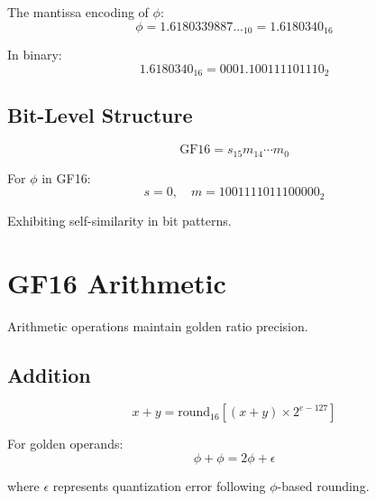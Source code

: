 \begin{theorem}
\label{thm:golden-mantissa}
The mantissa encoding of $\phi$:
\begin{equation}
\phi = 1.6180339887..._10 = 1.6180340_16
\end{equation}

In binary:
\begin{equation}
1.6180340_16 = 0001.100111101110_2
\end{equation}
\end{theorem}

\subsection{Bit-Level Structure}

\begin{equation}
\text{GF16} = s_{15} m_{14}\cdots m_0
\end{equation}

\begin{proposition}
\label{prop:bit-pattern}
For $\phi$ in GF16:
\begin{equation}
s = 0, \quad m = 1001111011100000_2
\end{equation}

Exhibiting self-similarity in bit patterns.
\end{proposition}

\section{GF16 Arithmetic}

Arithmetic operations maintain golden ratio precision.

\subsection{Addition}

\begin{definition}[GF16 Addition]
\label{def:gf16-add}
\begin{equation}
x + y = \text{round}_{16}\left[(x + y) \times 2^{e-127}\right]
\end{equation}
\end{definition}

\begin{theorem}
\label{thm:add-golden}
For golden operands:
\begin{equation}
\phi + \phi = 2\phi + \epsilon
\end{equation}

where $\epsilon$ represents quantization error following $\phi$-based rounding.
\end{theorem}

